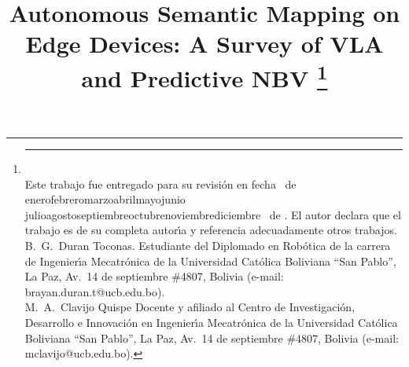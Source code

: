 \documentclass[conference]{IEEEtran}
\renewcommand{\today}{\number\day\ de \ifcase\month\or
	enero\or febrero\or marzo\or abril\or mayo\or junio\or
	julio\or agosto\or septiembre\or octubre\or noviembre\or diciembre\fi
	\ de \number\year}
\begin{document}
\title{Autonomous Semantic Mapping on Edge Devices: A Survey of VLA and Predictive NBV%
\thanks{\rule{0.94\columnwidth}{0.4pt}\\
Este trabajo fue entregado para su revisi\'{o}n en fecha \today.
El autor declara que el trabajo es de su completa autor\'{\i}a y referencia adecuadamente otros trabajos.\\[6pt]
B.~G.~Duran Toconas. Estudiante del Diplomado en Robótica de la carrera de Ingenier\'{\i}a Mecatr\'{o}nica de la Universidad Cat\'{o}lica Boliviana ``San Pablo'', La Paz, Av.~14 de septiembre \#4807, Bolivia (e-mail: brayan.duran.t@ucb.edu.bo).\\[3pt]
M.~A.~Clavijo Quispe Docente y afiliado al Centro de Investigaci\'{o}n, Desarrollo e Innovaci\'{o}n en Ingenier\'{\i}a Mecatr\'{o}nica de la Universidad Cat\'{o}lica Boliviana ``San Pablo'', La Paz, Av.~14 de septiembre \#4807, Bolivia (e-mail: mclavijo@ucb.edu.bo).}%
}
\author{
\and
{}
}
\maketitle
\end{document}
